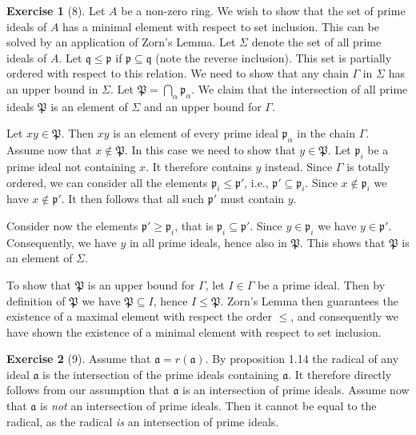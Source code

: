 \documentclass{article}
\theoremstyle{definition}
\newtheorem*{exercise}{Exercise}
\begin{document}
\begin{exercise}[8] Let $A$ be a non-zero ring. We wish to show that the
    set of prime ideals of $A$ has a minimal element with respect to
    set inclusion.  This can be solved by an application of Zorn's
    Lemma.  Let $\Sigma$ denote the set of all prime ideals of $A$.
    Let $\mathfrak{q} \leq \mathfrak{p}$ if $\mathfrak{p} \subseteq
    \mathfrak{q}$ (note the reverse inclusion).  This set is partially
    ordered with respect to this relation. We need to show that any
    chain $\Gamma$ in $\Sigma$ has an upper bound in $\Sigma$.  Let
    $\mathfrak{P} = \bigcap_{\alpha} \mathfrak{p}_\alpha$. We claim
    that the intersection of all prime ideals $\mathfrak{P}$ is an
    element of $\Sigma$ and an upper bound for $\Gamma$.

    Let $xy \in \mathfrak{P}$. Then $xy$ is an element of every prime
    ideal $\mathfrak{p}_\alpha$ in the chain $\Gamma$.  Assume now
    that $x \notin \mathfrak{P}$. In this case we need to show that $y
    \in \mathfrak{P}$. Let $\mathfrak{p}_i$ be a prime ideal not
    containing $x$. It therefore contains $y$ instead. Since $\Gamma$
    is totally ordered, we can consider all the elements
    $\mathfrak{p}_i \leq \mathfrak{p}'$, i.e., $\mathfrak{p}'
    \subseteq \mathfrak{p}_i$. Since $x \notin \mathfrak{p}_i$ we have
    $x \notin \mathfrak{p}'$. It then follows that all such
    $\mathfrak{p}'$ must contain $y$. 

    Consider now the elements $\mathfrak{p}' \geq \mathfrak{p}_i$,
    that is $\mathfrak{p}_i \subseteq \mathfrak{p}'$. Since $y \in
    \mathfrak{p}_i$ we have $y \in \mathfrak{p}'$. Consequently, we
    have $y$ in all prime ideals, hence also in $\mathfrak{P}$. This
    shows that $\mathfrak{P}$ is an element of $\Sigma$.

    To show that $\mathfrak{P}$ is an upper bound for $\Gamma$, let $I \in
    \Gamma$ be a prime ideal. Then by definition of $\mathfrak{P}$ we have
    $\mathfrak{P} \subseteq I$, hence $I \leq \mathfrak{P}$.  Zorn's Lemma
    then guarantees the existence of a maximal element with respect the
    order $\leq$, and consequently we have shown the existence of a minimal
    element with respect to set inclusion.
\end{exercise}  

\begin{exercise}[9]
    Assume that $\mathfrak{a} = r(\mathfrak{a})$. By proposition 1.14 the
    radical of any ideal $\mathfrak{a}$ is the intersection of the prime
    ideals containing $\mathfrak{a}$. It therefore directly follows from
    our assumption that $\mathfrak{a}$ is an intersection of prime ideals.
    Assume now that $\mathfrak{a}$ is \emph{not} an intersection of prime
    ideals. Then it cannot be equal to the radical, as the radical
    \emph{is} an intersection of prime ideals.
\end{exercise}
\end{document}
